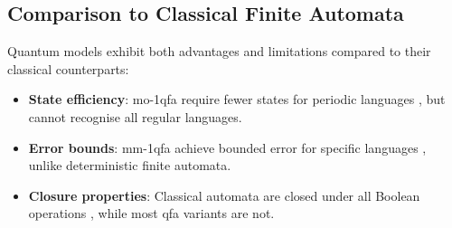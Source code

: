 \subsection*{Comparison to Classical Finite Automata}
\label{subsec:classical-comparison}
Quantum models exhibit both advantages and limitations compared to their classical counterparts:
\begin{itemize}
    \item \textbf{State efficiency}: \gls{mo-1qfa} require fewer states for periodic languages \cite{kondacs1997power}, but cannot recognise all regular languages.
    \item \textbf{Error bounds}: \gls{mm-1qfa} achieve bounded error for specific languages \cite{ambainis1998}, unlike deterministic finite automata.
    \item \textbf{Closure properties}: Classical automata are closed under all Boolean operations \cite{rabin1959}, while most \gls{qfa} variants are not.
\end{itemize}
